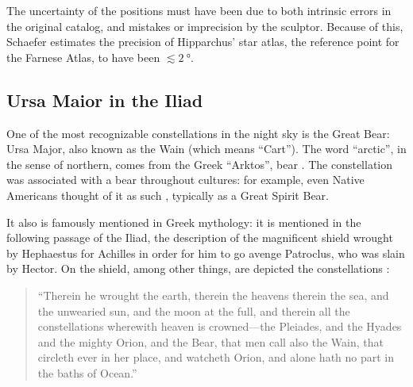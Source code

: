 \documentclass[main.tex]{subfiles}
\begin{document}
The uncertainty of the positions must have been due to both intrinsic errors in the original catalog, and mistakes or imprecision by the sculptor.
Because of this, Schaefer estimates the precision of Hipparchus' star atlas, the reference point for the Farnese Atlas, to have been \(\lesssim \SI{2}{\degree}\).

\subsection{Ursa Maior in the Iliad}

One of the most recognizable constellations in the night sky is the Great Bear: Ursa Major, also known as the Wain (which means ``Cart''). 
The word ``arctic'', in the sense of northern, comes from the Greek ``Arktos'', bear \cite[]{liddellGreekEnglishLexicon}.
The constellation was associated with a bear throughout cultures: for example, even Native Americans thought of it as such \cite[]{rogersOriginsAncientConstellations1998}, typically as a Great Spirit Bear. 

It also is famously mentioned in Greek mythology: it is mentioned in the following passage of the Iliad, the description of the magnificent shield wrought by Hephaestus for Achilles in order for him to go avenge Patroclus, who was slain by Hector.
On the shield, among other things, are depicted the constellations \cite[XVIII, 483--490]{murrayIliad1924}: 
%
\begin{quotation}
``Therein he wrought the earth, therein the heavens therein the sea, and the unwearied sun, and the moon at the full, and therein all the constellations wherewith heaven is crowned—the Pleiades, and the Hyades and the mighty Orion, and the Bear, that men call also the Wain, that circleth ever in her place, and watcheth Orion, and alone hath no part in the baths of Ocean.''
\end{quotation}
\end{document}
